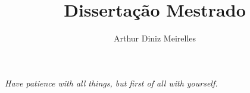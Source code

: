 \documentclass[openany,a4paper,12pt,oneside]{book}
\title{Dissertação Mestrado}
\author{Arthur Diniz Meirelles}
\date{}
\begin{document}



\newpage




\newpage




\begin{center}
\thispagestyle{empty}
\vspace*{\fill}
\textit{Have patience with all things, but first of all with yourself.}
\vspace*{\fill}
\end{center}


\end{document}
